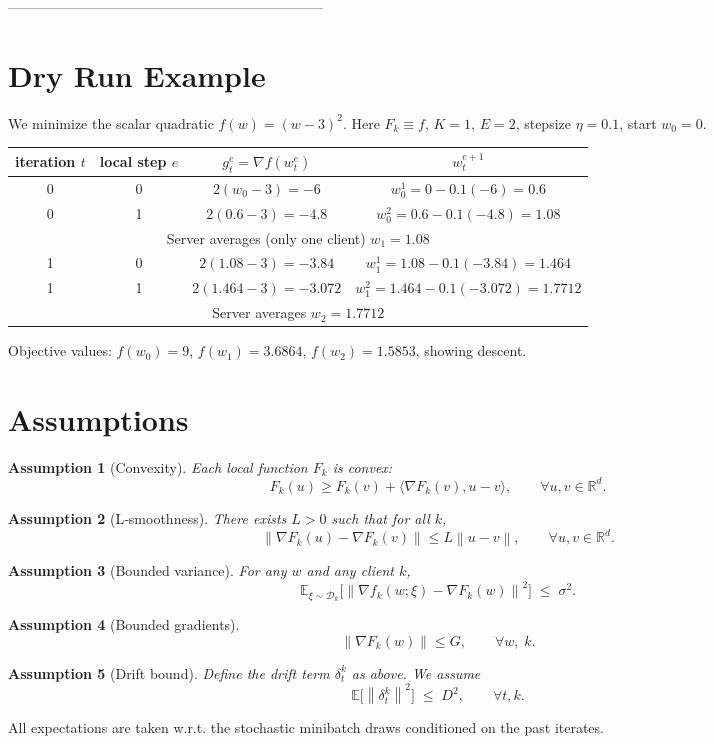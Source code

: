 \documentclass{article}
\newtheorem{assumption}{Assumption}
\newcommand{\EE}{\mathbb{E}}
\newcommand{\norm}[1]{\left\lVert#1\right\rVert}
\newcommand{\grad}{\nabla}
\newcommand{\RR}{\mathbb{R}}
\begin{document}
--------------------------------------------------------------------
\section*{Dry Run Example}
We minimize the scalar quadratic $f(w)=(w-3)^2$.
Here $F_k\equiv f$, $K=1$, $E=2$, stepsize $\eta=0.1$, start $w_0=0$.

\begin{center}
\begin{tabular}{c|c|c|c}
iteration $t$ & local step $e$ & $g_{t}^{e}=\grad f(w_{t}^{e})$ & $w_{t}^{e+1}$\\\hline
0 & 0 & $2(w_0-3) = -6$ & $w_{0}^{1}=0-0.1(-6)=0.6$\\
0 & 1 & $2(0.6-3)=-4.8$ & $w_{0}^{2}=0.6-0.1(-4.8)=1.08$\\
\hline
\multicolumn{4}{c}{Server averages (only one client) $w_1=1.08$}\\\hline
1 & 0 & $2(1.08-3)=-3.84$ & $w_{1}^{1}=1.08-0.1(-3.84)=1.464$\\
1 & 1 & $2(1.464-3)=-3.072$ & $w_{1}^{2}=1.464-0.1(-3.072)=1.7712$\\
\hline
\multicolumn{4}{c}{Server averages $w_2=1.7712$}
\end{tabular}
\end{center}
Objective values: $f(w_0)=9$, $f(w_1)=3.6864$, $f(w_2)=1.5853$, showing descent.

\section*{Assumptions}
\begin{assumption}[Convexity]\label{as:conv}
Each local function $F_k$ is convex:
\[
F_k(u)\ge F_k(v)+\langle \grad F_k(v),u-v\rangle,\qquad\forall u,v\in\RR^d .
\]
\end{assumption}
\begin{assumption}[L‑smoothness]\label{as:smooth}
There exists $L>0$ such that for all $k$,
\[
\norm{\grad F_k(u)-\grad F_k(v)}\le L\norm{u-v},\qquad\forall u,v\in\RR^d .
\]
\end{assumption}
\begin{assumption}[Bounded variance]\label{as:var}
For any $w$ and any client $k$,
\[
\EE_{\xi\sim\mathcal{D}_k}\!\bigl[\norm{ \grad f_k(w;\xi)-\grad F_k(w)}^2\bigr]\;\le\;\sigma^2 .
\]
\end{assumption}
\begin{assumption}[Bounded gradients]\label{as:grad}
\[
\norm{\grad F_k(w)}\le G,\qquad\forall w,\;k .
\]
\end{assumption}
\begin{assumption}[Drift bound]\label{as:drift}
Define the drift term $\delta_{t}^{k}$ as above. We assume
\[
\EE\!\bigl[\norm{\delta_{t}^{k}}^2\bigr]\;\le\; D^2,\qquad\forall t,k .
\]
\end{assumption}
All expectations are taken w.r.t. the stochastic minibatch draws conditioned on the past iterates.
\end{document}
